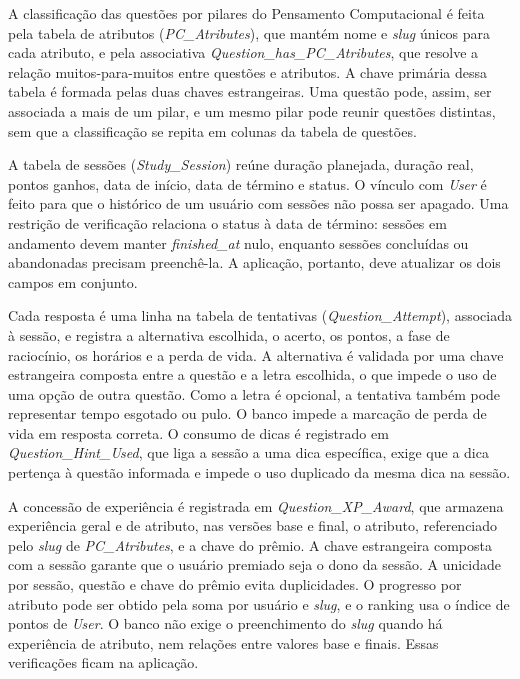 A classificação das questões por pilares do Pensamento Computacional é feita pela
tabela de atributos (\textit{PC\_Atributes}), que mantém nome e \textit{slug}
únicos para cada atributo, e pela associativa
\textit{Question\_has\_PC\_Atributes}, que resolve a relação muitos-para-muitos
entre questões e atributos. A chave primária dessa tabela é formada pelas duas
chaves estrangeiras. Uma questão pode, assim, ser associada a mais de um pilar, e
um mesmo pilar pode reunir questões distintas, sem que a classificação se repita
em colunas da tabela de questões.

A tabela de sessões
(\textit{Study\_Session}) reúne duração planejada,
duração real, pontos ganhos, data de início, data de término e status. O vínculo
com \textit{User} é feito para que o histórico de um usuário
com sessões não possa ser apagado. Uma restrição de verificação relaciona o status
à data de término: sessões em andamento devem manter \textit{finished\_at} nulo,
enquanto sessões concluídas ou abandonadas precisam preenchê-la. A aplicação,
portanto, deve atualizar os dois campos em conjunto.

Cada resposta é uma linha na tabela de tentativas (\textit{Question\_Attempt}),
associada à sessão, e registra a alternativa
escolhida, o acerto, os pontos, a fase de raciocínio, os horários e a perda de
vida. A alternativa é validada por uma chave estrangeira composta entre a questão
e a letra escolhida, o que impede o uso de uma opção de outra questão. Como a
letra é opcional, a tentativa também pode representar tempo esgotado ou pulo. O
banco impede a marcação de perda de vida em resposta correta. O consumo de dicas é registrado em
\textit{Question\_Hint\_Used}, que liga a sessão a uma dica específica, exige que
a dica pertença à questão informada e impede o uso duplicado da mesma dica na
sessão.

A concessão de experiência é registrada em \textit{Question\_XP\_Award}, que
armazena experiência geral e de atributo, nas versões base e final, o atributo,
referenciado pelo \textit{slug} de \textit{PC\_Atributes}, e a chave
do prêmio. A chave estrangeira composta com a sessão garante que o usuário
premiado seja o dono da sessão. A unicidade por sessão, questão e chave do prêmio
evita duplicidades. O progresso por atributo pode ser obtido pela soma por
usuário e \textit{slug}, e o ranking usa o índice de pontos de \textit{User}. O
banco não exige o preenchimento do \textit{slug} quando há experiência de
atributo, nem relações entre valores base e finais. Essas verificações ficam na
aplicação.

